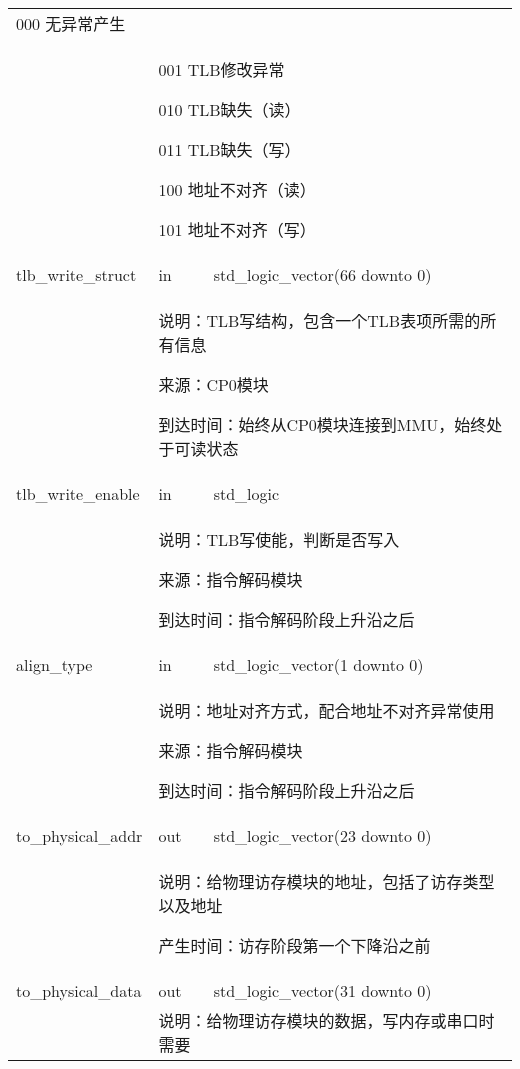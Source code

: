 \begin{tabularx}{\textwidth}{lll}
{                000 无异常产生
            } \\
            &
            \multicolumn{2}{X}{
                001 TLB修改异常

                010 TLB缺失（读）

                011 TLB缺失（写）

                100 地址不对齐（读）

                101 地址不对齐（写）
            } \\
            \midrule
            tlb\_write\_struct      & in       & std\_logic\_vector(66 downto 0) \\
            \cmidrule(l){2-3}
            &
            \multicolumn{2}{X}{
                说明：TLB写结构，包含一个TLB表项所需的所有信息

                来源：CP0模块

                到达时间：始终从CP0模块连接到MMU，始终处于可读状态
            } \\
            \midrule
            tlb\_write\_enable      & in       & std\_logic \\
            \cmidrule(l){2-3}
            &
            \multicolumn{2}{X}{
                说明：TLB写使能，判断是否写入

                来源：指令解码模块
                
                到达时间：指令解码阶段上升沿之后
            } \\
            \midrule
            align\_type      & in       & std\_logic\_vector(1 downto 0) \\
            \cmidrule(l){2-3}
            &
            \multicolumn{2}{X}{
                说明：地址对齐方式，配合地址不对齐异常使用

                来源：指令解码模块
                
                到达时间：指令解码阶段上升沿之后
            } \\
            \midrule
            to\_physical\_addr      & out       & std\_logic\_vector(23 downto 0) \\
            \cmidrule(l){2-3}
            &
            \multicolumn{2}{X}{
                说明：给物理访存模块的地址，包括了访存类型以及地址

                产生时间：访存阶段第一个下降沿之前
            } \\
            \midrule
            to\_physical\_data      & out       & std\_logic\_vector(31 downto 0) \\
            \cmidrule(l){2-3}
            &
            \multicolumn{2}{X}{
                说明：给物理访存模块的数据，写内存或串口时需要

}
\end{tabularx}
